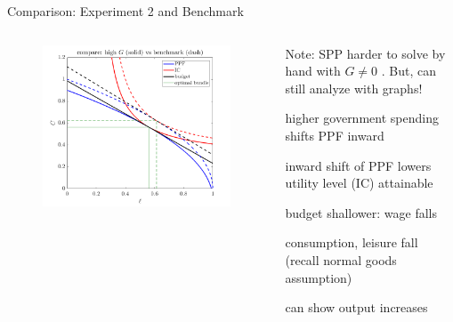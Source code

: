 \documentclass[11pt,aspectratio=169,usenames,dvipsnames]{beamer}
\let\tempone\itemize
\let\temptwo\enditemize
\renewenvironment{itemize}{\tempone\addtolength{\itemsep}{\fill}}{\temptwo}
\newcommand{\goto}[2]{\hyperlink{#2}{\beamergotobutton{#1}}}
\begin{document}
\begin{frame}{Comparison: Experiment 2 and Benchmark}
\label{slide:Comparison__Experiment_2_and_Benchmark}
    \begin{columns}
        \begin{column}{0.5\textwidth}
            \begin{figure}
                \includegraphics[width=\textwidth]{./figures/Exp2BenchmarkCompare.png}
            \end{figure}
        \end{column}
        \begin{column}{0.5\textwidth}
            Note: SPP harder to solve by hand with $ G \neq 0$ \goto{details}{slide:How_to_solve___G__neq_0__}.
            But, can still analyze with graphs!
            \begin{itemize}
                \item higher government spending shifts PPF \alert{inward}
                \item inward shift of PPF lowers utility level (IC) attainable
                \item budget shallower: wage falls
                \item consumption, leisure fall (recall normal goods assumption)
                \item can show output increases
            \end{itemize}
        \end{column}
    \end{columns}
\end{frame}
\end{document}
